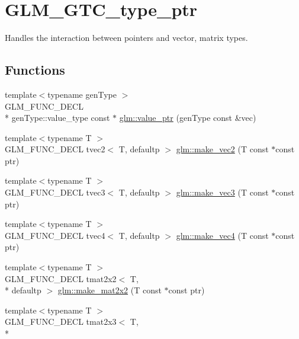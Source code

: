 \hypertarget{group__gtc__type__ptr}{\section{G\-L\-M\-\_\-\-G\-T\-C\-\_\-type\-\_\-ptr}
\label{group__gtc__type__ptr}
}


Handles the interaction between pointers and vector, matrix types.  


\subsection*{Functions}
\begin{DoxyCompactItemize}
\item 
{\footnotesize template$<$typename gen\-Type $>$ }\\G\-L\-M\-\_\-\-F\-U\-N\-C\-\_\-\-D\-E\-C\-L \\*
gen\-Type\-::value\-\_\-type const $\ast$ \hyperlink{group__gtc__type__ptr_gaf019636bb8bd7c9efb7c7ce3bb23bcfc}{glm\-::value\-\_\-ptr} (gen\-Type const \&vec)
\item 
{\footnotesize template$<$typename T $>$ }\\G\-L\-M\-\_\-\-F\-U\-N\-C\-\_\-\-D\-E\-C\-L tvec2$<$ T, defaultp $>$ \hyperlink{group__gtc__type__ptr_ga5f7393c30970c5949be13ceb525093a6}{glm\-::make\-\_\-vec2} (T const $\ast$const ptr)
\item 
{\footnotesize template$<$typename T $>$ }\\G\-L\-M\-\_\-\-F\-U\-N\-C\-\_\-\-D\-E\-C\-L tvec3$<$ T, defaultp $>$ \hyperlink{group__gtc__type__ptr_ga86f4bc63570db86346db2e567fb760f6}{glm\-::make\-\_\-vec3} (T const $\ast$const ptr)
\item 
{\footnotesize template$<$typename T $>$ }\\G\-L\-M\-\_\-\-F\-U\-N\-C\-\_\-\-D\-E\-C\-L tvec4$<$ T, defaultp $>$ \hyperlink{group__gtc__type__ptr_ga152345176b8951c15711f6ed4f6fc237}{glm\-::make\-\_\-vec4} (T const $\ast$const ptr)
\item 
{\footnotesize template$<$typename T $>$ }\\G\-L\-M\-\_\-\-F\-U\-N\-C\-\_\-\-D\-E\-C\-L tmat2x2$<$ T, \\*
defaultp $>$ \hyperlink{group__gtc__type__ptr_gadb29e510762e1042069cb28bf24ae990}{glm\-::make\-\_\-mat2x2} (T const $\ast$const ptr)
\item 
{\footnotesize template$<$typename T $>$ }\\G\-L\-M\-\_\-\-F\-U\-N\-C\-\_\-\-D\-E\-C\-L tmat2x3$<$ T, \\*

\end{DoxyCompactItemize}
